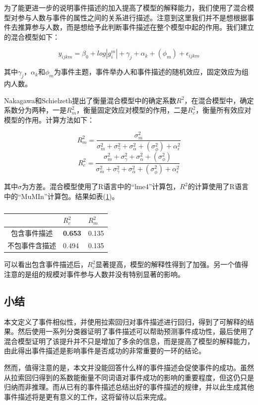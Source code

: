 \documentclass[12pt]{template}
\begin{document}
为了能更进一步的说明事件描述的加入提高了模型的解释能力，我们使用了混合模型对参与人数与事件的属性之间的关系进行描述。注意到这里我们并不是想根据事件去推算参与人数，而是想给予此判断事件描述在整个模型中起的作用。我们建立的混合模型如下：

\[
y_{ijkm}=\beta_0+log|g_i^m|+\gamma_j+\alpha_k+ (\phi_m) +\epsilon_{ijkm}
\]

其中\(\gamma_j\)，\(\alpha_k\)和\(\phi_m\)为事件主题，事件举办人和事件描述的随机效应，固定效应为组内人数。

Nakagawa和Schielzeth\cite{nakagawa_ageneralandsimplemethodforobtaining_2013}提出了衡量混合模型中的确定系数\(R^2\)，在混合模型中，确定系数分为两种，一是\(R_m^2\)，衡量固定效应对模型的作用，二是\(R_c^2\)，衡量所有效应对模型的作用。计算方法如下：

\[
R_m^2=\frac{\sigma_m^2}{\sigma_m^2+\sigma_\gamma^2+\sigma_\alpha^2+(\sigma_\phi^2)+\alpha_\epsilon^2}
\] \[
R_c^2=\frac{\sigma_m^2+\sigma_\gamma^2+\sigma_\alpha^2+(\sigma_\phi^2)}{\sigma_m^2+\sigma_\gamma^2+\sigma_\alpha^2+(\sigma_\phi^2)+\alpha_\epsilon^2}
\]

其中\(\sigma\)为方差。混合模型使用了R语言中的``lme4''计算包\cite{lme4}，\(R^2\)的计算使用了R语言
中的``MuMIn''计算包\cite{MuMIn}。结果如表(\ref{t3})。

\begin{table}[htbp]
	\centering
  \caption{}
  \label{t3}
	\begin{tabular}{cll}
		\hline
                           &  \(R_c^2\) & \(R_m^2\) \\ 
    \hline
		包含事件描述                       & \textbf{0.653} & 0.135 \\ 
    不包事件含描述                        & 0.494 & 0.135 \\ 
    \hline
	\end{tabular}
\end{table}

可以看出包含事件描述后，\(R_c^2\)显著提高，模型的解释性得到了加强。另一个值得注意的是组的规模对事件参与人数并没有特别显著的影响。

\subsection{小结}
本文定义了事件相似性，并使用拉索回归对事件描述进行回归，得到了可解释的结果。然后使用一系列分类器证明了事件描述可以帮助预测事件成功性，最后使用了混合模型证明了该提升并不只是增加了多余的信息，而是提高了模型的解释能力，由此得出事件描述是影响事件是否成功的非常重要的一环的结论。

然而，值得注意的是，本文并没能回答什么样的事件描述会促使事件的成功。虽然从拉索回归得到的系数能衡量不同词语对事件成功的影响的重要程度，但这仍只是归纳而非推理。而从已有的事件描述总结出好的事件描述的规律，并以此生成其他事件描述将是更有意义的工作，这将留待以后来完成。
\end{document}
